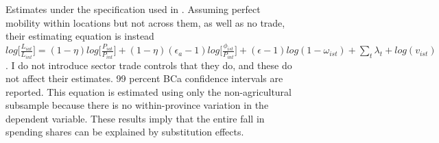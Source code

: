 \documentclass[]{article}
\theoremstyle{plain}
\begin{document}
\begin{figure}


	\caption{Estimates under the specification used in \cite{cominetal2021}. Assuming perfect mobility within locations but not across them, as well as no trade, their estimating equation is instead $log\bigg[\frac{L_{iat}}{L_{int}}\bigg] =  (1-\eta)log\bigg[\frac{P_{iat}}{P_{int}}\bigg] +  (1-\eta)(\epsilon_{a} - 1)log\bigg[\frac{\phi_{ist}}{P_{int}}\bigg] + (\epsilon - 1)log(1-\omega_{ist}) + \sum_{t}\lambda_{t} + log(v_{ist})$. I do not introduce sector trade controls that they do, and these do not affect their estimates. 99 percent BCa confidence intervals are reported. This equation is estimated using only the non-agricultural subsample because there is no within-province variation in the dependent variable. These results imply that the entire fall in spending shares can be explained by substitution effects.}
	\label{fig:cominestimate}
\end{figure}


\end{document}
